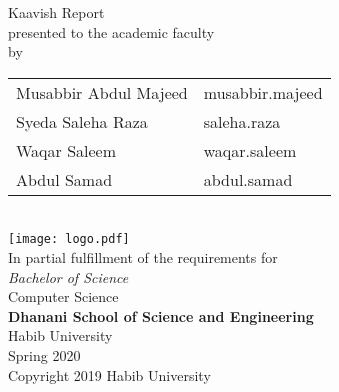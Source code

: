 \begin{titlepage}
  \begin{center}
    \vfill
    \textbf{\Huge \Title}
    \bigskip

    {\large Kaavish Report\\
      presented to the academic faculty\\
      by\\
      \begin{tabular}{ll}
        Musabbir Abdul Majeed & musabbir.majeed\\
        Syeda Saleha Raza & saleha.raza\\
        Waqar Saleem & waqar.saleem\\
        Abdul Samad & abdul.samad\\
      \end{tabular}
    }\\\vfill
    \texttt{[image: logo.pdf]}\\
    {\large In partial fulfillment of the requirements for\\
      \textit{Bachelor of Science}\\
      Computer Science\\\medskip
      \textbf{Dhanani School of Science and Engineering}\\\medskip
      Habib University\\\smallskip
      Spring 2020
    }\\\vfill
    Copyright {\scriptsize \textcopyright} 2019 Habib University
  \end{center}
\end{titlepage}

